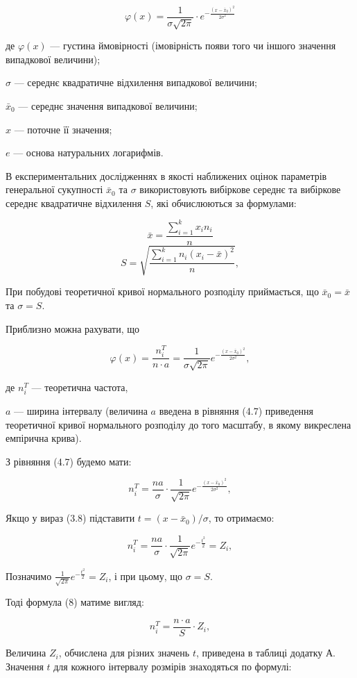 \[
\varphi(x) = \frac{1}{\sigma \sqrt{2\pi}} \cdot e^{-\frac{(x - \bar{x}_0)^2}{2\sigma^2}} \tag{3.4}
\]

де $\varphi(x)$ — густина ймовірності (імовірність появи того чи іншого значення випадкової величини);

$\sigma$ — середнє квадратичне відхилення випадкової величини;

$\bar{x}_0$ — середнє значення випадкової величини;

$x$ — поточне її значення;

$e$ — основа натуральних логарифмів.

В експериментальних дослідженнях в якості наближених оцінок параметрів генеральної сукупності $\bar{x}_0$ та $\sigma$ використовують вибіркове середнє та вибіркове середнє квадратичне відхилення $S$, які обчислюються за формулами:

\[
\bar{x} = \frac{\sum_{i=1}^{k} x_i n_i}{n} \tag{3.5}
\]
\[
S = \sqrt{ \frac{ \sum\limits_{i=1}^{k} n_i (x_i - \bar{x})^2 }{n} }, \tag{3.6}
\]

При побудові теоретичної кривої нормального розподілу приймається, що $\bar{x}_0 = \bar{x}$ та $\sigma = S$.

Приблизно можна рахувати, що

\[
\varphi(x) = \frac{n_i^T}{n \cdot a} = \frac{1}{\sigma \sqrt{2 \pi}} e^{-\frac{(x - \bar{x}_0)^2}{2 \sigma^2}}, \tag{3.7}
\]

де $n_i^T$ — теоретична частота, 

$a$ — ширина інтервалу (величина $a$ введена в рівняння (4.7) приведення теоретичної кривої нормального розподілу до того масштабу, в якому викреслена емпірична крива).

З рівняння (4.7) будемо мати:

\[
n_i^T = \frac{n a}{\sigma} \cdot \frac{1}{\sqrt{2 \pi}} e^{-\frac{(x - \bar{x}_0)^2}{2 \sigma^2}}, \tag{3.8}
\]

Якщо у вираз (3.8) підставити $t = (x - \bar{x}_0) / \sigma$, то отримаємо:

\[
n_i^T = \frac{n a}{\sigma} \cdot \frac{1}{\sqrt{2 \pi}} e^{-\frac{t^2}{2}} = Z_i,
\]

Позначимо $\frac{1}{\sqrt{2 \pi}} e^{-\frac{t^2}{2}} = Z_i$, і при цьому, що $\sigma = S$.

Тоді формула (8) матиме вигляд:

\[
n_i^T = \frac{n \cdot a}{S} \cdot Z_i, \tag{3.9}
\]

Величина $Z_i$, обчислена для різних значень $t$, приведена в таблиці додатку А. Значення $t$ для кожного інтервалу розмірів знаходяться по формулі:

